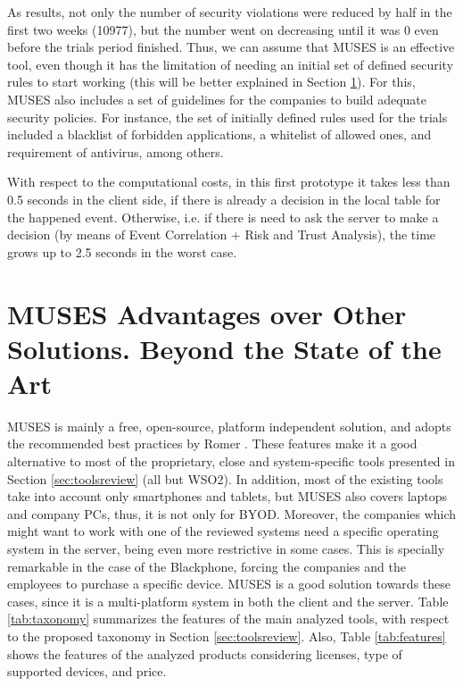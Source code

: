 As results, not only the number of security violations were reduced by half in the first two weeks (10977), but the number went on decreasing until it was 0 even before the trials period finished. Thus, we can assume that MUSES is an effective tool, even though it has the limitation of needing an initial set of defined security rules to start working (this will be better explained in Section \ref{sec:comparison}). For this, MUSES also includes a set of guidelines for the companies to build adequate security policies. For instance, the set of initially defined rules used for the trials included a blacklist of forbidden applications, a whitelist of allowed ones, and requirement of antivirus, among others.

With respect to the computational costs, in this first prototype it takes less than 0.5 seconds in the client side, if there is already a decision in the local table for the happened event. Otherwise, i.e. if there is need to ask the server to make a decision (by means of Event Correlation + Risk and Trust Analysis), the time grows up to 2.5 seconds in the worst case.

\section{MUSES Advantages over Other Solutions. Beyond the State of the Art}
\label{sec:comparison}

MUSES is mainly a free, open-source, platform independent solution, and adopts the recommended best practices by Romer \cite{Romer14BestPractices}. %
These features make it a good alternative to most of the proprietary, close and system-specific tools presented in Section \ref{sec:toolsreview} (all but WSO2). In addition, most of the existing tools take into account only smartphones and tablets, but MUSES also covers laptops and company PCs, thus, it is not only for BYOD. Moreover, the companies which might want to work with one of the reviewed systems need a specific operating system in the server, being even more restrictive in some cases. This is specially remarkable in the case of the Blackphone, forcing the companies and the employees to purchase a specific device. MUSES is a good solution towards these cases, since it is a multi-platform system in both the client and the server. 
Table \ref{tab:taxonomy} summarizes the features of the main analyzed tools, with respect to the proposed taxonomy in Section \ref{sec:toolsreview}. Also, Table \ref{tab:features} shows the features of the analyzed products considering licenses, type of supported devices, and price.

